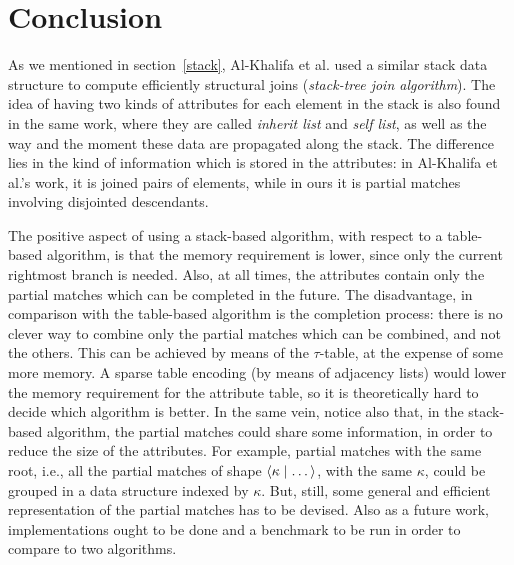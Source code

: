 
\section{Conclusion}
\label{conclusion}

As we mentioned in section~\ref{stack}, Al-Khalifa et
al. \cite{AlKhalifa:2002} used a similar stack data structure to
compute efficiently structural joins (\emph{stack-tree join
  algorithm}). The idea of having two kinds of attributes for each
element in the stack is also found in the same work, where they are
called \emph{inherit list} and \emph{self list}, as well as the way
and the moment these data are propagated along the stack. The
difference lies in the kind of information which is stored in the
attributes: in Al-Khalifa et al.'s work, it is joined pairs of
elements, while in ours it is partial matches involving disjointed
descendants.

The positive aspect of using a stack\hyp{}based algorithm, with
respect to a table\hyp{}based algorithm, is that the memory
requirement is lower, since only the current rightmost branch is
needed. Also, at all times, the attributes contain only the partial
matches which can be completed in the future. The disadvantage, in
comparison with the table\hyp{}based algorithm is the completion
process: there is no clever way to combine only the partial matches
which can be combined, and not the others. This can be achieved by
means of the \(\tau\)-table, at the expense of some more memory. A
sparse table encoding (by means of adjacency lists) would lower the
memory requirement for the attribute table, so it is theoretically
hard to decide which algorithm is better. In the same vein, notice
also that, in the stack\hyp{}based algorithm, the partial matches
could share some information, in order to reduce the size of the
attributes. For example, partial matches with the same root, i.e., all
the partial matches of shape \(\langle \kappa \mid \dots\rangle\), with the same
\(\kappa\), could be grouped in a data structure indexed by
\(\kappa\). But, still, some general and efficient representation of
the partial matches has to be devised. Also as a future work,
implementations ought to be done and a benchmark to be run in order to
compare to two algorithms.


